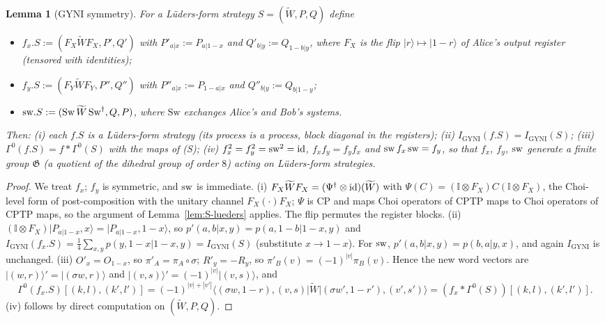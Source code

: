 \documentclass[aps,pra,onecolumn,notitlepage,superscriptaddress,longbibliography,nofootinbib,11pt]{revtex4-2}
\newtheorem{lemma}{Lemma}
\theoremstyle{remark}
\newcommand{\ket}[1]{\lvert #1\rangle}
\newcommand{\bra}[1]{\langle #1\rvert}
\newcommand{\one}{\mathbb{I}}
\newcommand{\Igy}{I_{\mathrm{GYNI}}}
\newcommand{\GG}{\mathfrak{G}}
\begin{document}
\begin{lemma}[GYNI symmetry]\label{lem:S-sym}
For a L\"uders-form strategy $S=(\widetilde W,P,Q)$ define
\begin{itemize}
\item $f_x.S:=(F_X\widetilde WF_X,P',Q')$ with $P'_{a|x}:=P_{a|1-x}$ and $Q'_{b|y}:=Q_{1-b|y}$, where $F_X$ is the flip $\ket{r}\mapsto\ket{1-r}$ of Alice's output register (tensored with identities);
\item $f_y.S:=(F_Y\widetilde WF_Y,P'',Q'')$ with $P''_{a|x}:=P_{1-a|x}$ and $Q''_{b|y}:=Q_{b|1-y}$;
\item ${\rm sw}.S:=(\mathrm{Sw}\,\widetilde W\,\mathrm{Sw}^\dagger,Q,P)$, where $\mathrm{Sw}$ exchanges Alice's and Bob's systems.
\end{itemize}
Then: (i) each $f.S$ is a L\"uders-form strategy (its process is a process, block diagonal in the registers); (ii) $\Igy(f.S)=\Igy(S)$; (iii) $\Gamma^0(f.S)=f*\Gamma^0(S)$ with the maps of (S); (iv) $f_x^2=f_y^2={\rm sw}^2={\rm id}$, $f_xf_y=f_yf_x$ and ${\rm sw}\,f_x\,{\rm sw}=f_y$, so that $f_x$, $f_y$, ${\rm sw}$ generate a finite group $\GG$ (a quotient of the dihedral group of order $8$) acting on L\"uders-form strategies.
\end{lemma}

\begin{proof}
We treat $f_x$; $f_y$ is symmetric, and ${\rm sw}$ is immediate. (i) $F_X\widetilde WF_X=(\Psi^\dagger\otimes{\rm id})(\widetilde W)$ with $\Psi(C)=(\one\otimes F_X)C(\one\otimes F_X)$, the Choi-level form of post-composition with the unitary channel $F_X(\cdot)F_X$; $\Psi$ is CP and maps Choi operators of CPTP maps to Choi operators of CPTP maps, so the argument of Lemma~\ref{lem:S-lueders} applies. The flip permutes the register blocks. (ii) $(\one\otimes F_X)\ket{P_{a|1-x},x}=\ket{P_{a|1-x},1-x}$, so $p'(a,b|x,y)=p(a,1-b|1-x,y)$ and $\Igy(f_x.S)=\frac14\sum_{x,y}p(y,1-x|1-x,y)=\Igy(S)$ (substitute $x\to1-x$). For ${\rm sw}$, $p'(a,b|x,y)=p(b,a|y,x)$, and again $\Igy$ is unchanged. (iii) $O'_x=O_{1-x}$, so $\pi'_A=\pi_A\circ\sigma$; $R'_y=-R_y$, so $\pi'_B(v)=(-1)^{|v|}\pi_B(v)$. Hence the new word vectors are $\ket{(w,r)}'=\ket{(\sigma w,r)}$ and $\ket{(v,s)}'=(-1)^{|v|}\ket{(v,s)}$, and
\begin{equation}
\Gamma^0(f_x.S)[(k,l),(k',l')]=(-1)^{|v|+|v'|}\bra{(\sigma w,1-r),(v,s)}\widetilde W\ket{(\sigma w',1-r'),(v',s')}=(f_x*\Gamma^0(S))[(k,l),(k',l')].
\end{equation}
(iv) follows by direct computation on $(\widetilde W,P,Q)$.
\end{proof}
\end{document}
